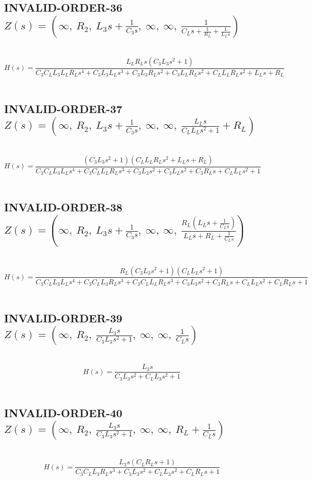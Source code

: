 \documentclass{article}
\begin{document}
\subsection{INVALID-ORDER-36 $Z(s) = \left( \infty, \  R_{2}, \  L_{3} s + \frac{1}{C_{3} s}, \  \infty, \  \infty, \  \frac{1}{C_{L} s + \frac{1}{R_{L}} + \frac{1}{L_{L} s}}\right)$ } \ 
\textbf{\[H(s) = \frac{L_{L} R_{L} s \left(C_{3} L_{3} s^{2} + 1\right)}{C_{3} C_{L} L_{3} L_{L} R_{L} s^{4} + C_{3} L_{3} L_{L} s^{3} + C_{3} L_{3} R_{L} s^{2} + C_{3} L_{L} R_{L} s^{2} + C_{L} L_{L} R_{L} s^{2} + L_{L} s + R_{L}}\] } \ 
\subsection{INVALID-ORDER-37 $Z(s) = \left( \infty, \  R_{2}, \  L_{3} s + \frac{1}{C_{3} s}, \  \infty, \  \infty, \  \frac{L_{L} s}{C_{L} L_{L} s^{2} + 1} + R_{L}\right)$ } \ 
\textbf{\[H(s) = \frac{\left(C_{3} L_{3} s^{2} + 1\right) \left(C_{L} L_{L} R_{L} s^{2} + L_{L} s + R_{L}\right)}{C_{3} C_{L} L_{3} L_{L} s^{4} + C_{3} C_{L} L_{L} R_{L} s^{3} + C_{3} L_{3} s^{2} + C_{3} L_{L} s^{2} + C_{3} R_{L} s + C_{L} L_{L} s^{2} + 1}\] } \ 
\subsection{INVALID-ORDER-38 $Z(s) = \left( \infty, \  R_{2}, \  L_{3} s + \frac{1}{C_{3} s}, \  \infty, \  \infty, \  \frac{R_{L} \left(L_{L} s + \frac{1}{C_{L} s}\right)}{L_{L} s + R_{L} + \frac{1}{C_{L} s}}\right)$ } \ 
\textbf{\[H(s) = \frac{R_{L} \left(C_{3} L_{3} s^{2} + 1\right) \left(C_{L} L_{L} s^{2} + 1\right)}{C_{3} C_{L} L_{3} L_{L} s^{4} + C_{3} C_{L} L_{3} R_{L} s^{3} + C_{3} C_{L} L_{L} R_{L} s^{3} + C_{3} L_{3} s^{2} + C_{3} R_{L} s + C_{L} L_{L} s^{2} + C_{L} R_{L} s + 1}\] } \ 
\subsection{INVALID-ORDER-39 $Z(s) = \left( \infty, \  R_{2}, \  \frac{L_{3} s}{C_{3} L_{3} s^{2} + 1}, \  \infty, \  \infty, \  \frac{1}{C_{L} s}\right)$ } \ 
\textbf{\[H(s) = \frac{L_{3} s}{C_{3} L_{3} s^{2} + C_{L} L_{3} s^{2} + 1}\] } \ 
\subsection{INVALID-ORDER-40 $Z(s) = \left( \infty, \  R_{2}, \  \frac{L_{3} s}{C_{3} L_{3} s^{2} + 1}, \  \infty, \  \infty, \  R_{L} + \frac{1}{C_{L} s}\right)$ } \ 
\textbf{\[H(s) = \frac{L_{3} s \left(C_{L} R_{L} s + 1\right)}{C_{3} C_{L} L_{3} R_{L} s^{3} + C_{3} L_{3} s^{2} + C_{L} L_{3} s^{2} + C_{L} R_{L} s + 1}\] } \ 
\end{document}
